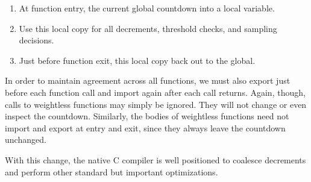 \begin{enumerate}
\item At function entry,  the current global countdown
  into a local variable.
\item Use this local copy for all decrements, threshold checks, and
  sampling decisions.
\item Just before function exit,  this local copy back
  out to the global.
\end{enumerate}

In order to maintain agreement across all functions, we must also
export just before each function call and import again after each call
returns.  Again, though, calls to weightless functions may simply be
ignored.  They will not change or even inspect the countdown.
Similarly, the bodies of weightless functions need not import and
export at entry and exit, since they always leave the countdown
unchanged.

With this change, the native C compiler is well positioned to coalesce
decrements and perform other standard but important optimizations.


